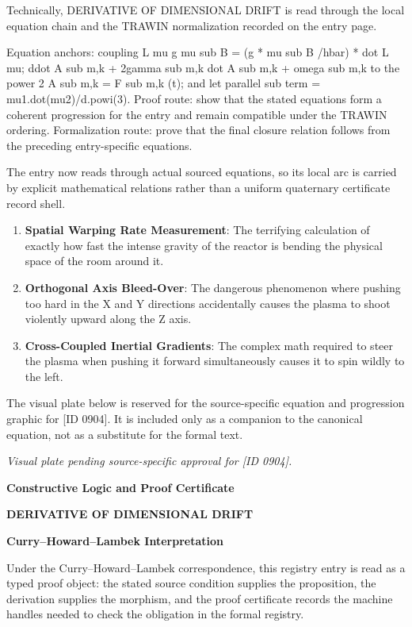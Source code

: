 Technically, DERIVATIVE OF DIMENSIONAL DRIFT is read through the local equation chain and the TRAWIN normalization recorded on the entry page.

Equation anchors: coupling L mu g mu sub B = (g * mu sub B /hbar) * dot L mu; ddot A sub m,k + 2gamma sub m,k dot A sub m,k + omega sub m,k to the power 2 A sub m,k = F sub m,k (t); and let parallel sub term = mu1.dot(mu2)/d.powi(3). Proof route: show that the stated equations form a coherent progression for the entry and remain compatible under the TRAWIN ordering. Formalization route: prove that the final closure relation follows from the preceding entry-specific equations.

The entry now reads through actual sourced equations, so its local arc is carried by explicit mathematical relations rather than a uniform quaternary certificate record shell.
\endgroup

\begin{enumerate}[leftmargin=1.6em,itemsep=6pt,topsep=4pt]
\item \textbf{Spatial Warping Rate Measurement}: The terrifying calculation of exactly how fast the intense gravity of the reactor is bending the physical space of the room around it.
\item \textbf{Orthogonal Axis Bleed-Over}: The dangerous phenomenon where pushing too hard in the X and Y directions accidentally causes the plasma to shoot violently upward along the Z axis.
\item \textbf{Cross-Coupled Inertial Gradients}: The complex math required to steer the plasma when pushing it forward simultaneously causes it to spin wildly to the left.
\end{enumerate}

\begingroup\footnotesize\sloppy
The visual plate below is reserved for the source-specific equation and progression graphic for [ID 0904]. It is included only as a companion to the canonical equation, not as a substitute for the formal text.
\par\endgroup
\begingroup\footnotesize\itshape
Visual plate pending source-specific approval for [ID 0904].
\par\endgroup

\clearpage
\begingroup\tzpsupportsetup
\noindent\textbf{\fontsize{10.8pt}{12.8pt}\selectfont [ID 0904] Constructive Logic and Proof Certificate}\par
\noindent\textbf{\fontsize{10pt}{12pt}\selectfont DERIVATIVE OF DIMENSIONAL DRIFT}\par
\vspace{0.45em}
\begingroup
\footnotesize
\setlength{\parskip}{0.22em}
\setlength{\parindent}{0pt}
\noindent\textbf{Curry--Howard--Lambek Interpretation}\par
Under the Curry--Howard--Lambek correspondence, this registry entry is read as a typed proof
object: the stated source condition supplies the proposition, the derivation supplies the
morphism, and the proof certificate records the machine handles needed to check the obligation
in the formal registry.

